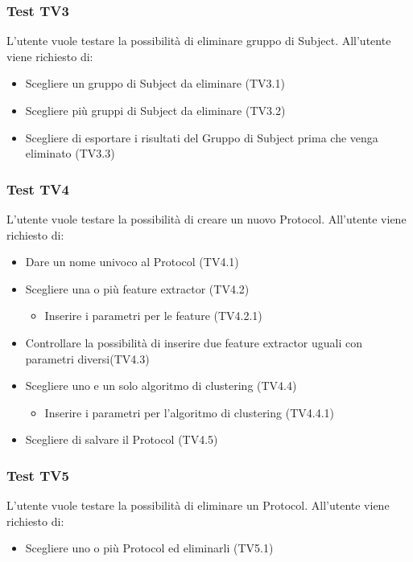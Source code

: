 \subsubsection{Test TV3}
\label{tv3}
L'utente vuole testare la possibilità di eliminare gruppo di Subject.
All'utente viene richiesto di:
\begin{itemize}
\item Scegliere un gruppo di Subject da eliminare (TV3.1)
\item Scegliere più gruppi di Subject da eliminare (TV3.2)
\item Scegliere di esportare i risultati del Gruppo di Subject prima che venga eliminato (TV3.3)
\end{itemize}

\subsubsection{Test TV4}
\label{tv4}
L'utente vuole testare la possibilità di creare un nuovo Protocol.
All'utente viene richiesto di:
\begin{itemize}
\item Dare un nome univoco al Protocol (TV4.1)
\item Scegliere una o più feature extractor (TV4.2)
	\begin{itemize}
	\item Inserire i parametri per le feature (TV4.2.1)
	\end{itemize} 
\item Controllare la possibilità di inserire due feature extractor uguali con parametri diversi(TV4.3)
\item Scegliere uno e un solo algoritmo di clustering (TV4.4)
	\begin{itemize}
	\item Inserire i parametri per l'algoritmo di clustering (TV4.4.1)
	\end{itemize}
\item Scegliere di salvare il Protocol (TV4.5)
\end{itemize}

\subsubsection{Test TV5}
\label{tv5}
L'utente vuole testare la possibilità di eliminare un Protocol.
All'utente viene richiesto di:
\begin{itemize}
\item Scegliere uno o più Protocol ed eliminarli (TV5.1)
\end{itemize}

